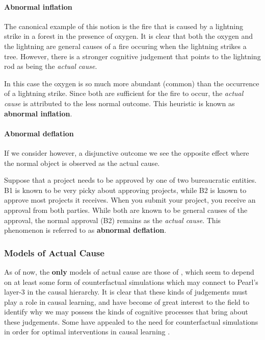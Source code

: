 \documentclass[10pt,letterpaper]{article}
\begin{document}
\paragraph{Abnormal inflation}
The canonical example of this notion is the fire that is caused by a lightning strike in a forest in the presence of oxygen. It is clear that both the oxygen and the lightning are general causes of a fire occuring when the lightning strikes a tree. However, there is a stronger cognitive judgement that points to the lightning rod as being the \textit{actual cause}.

In this case the oxygen is so much more abundant (common) than the occurrence of a lightning strike. Since both are sufficient for the fire to occur, the \textit{actual cause} is attributed to the less normal outcome. This heuristic is known as \textbf{abnormal inflation}.

\paragraph{Abnormal deflation}
If we consider however, a disjunctive outcome we see the opposite effect where the normal object is observed as the actual cause.

Suppose that a project needs to be approved by one of two bureaucratic entities. B1 is known to be very picky about approving projects, while B2 is known to approve most projects it receives. When you submit your project, you receive an approval from both parties. While both are known to be general causes of the approval, the normal approval (B2) remains as the \textit{actual cause}. This phenomenon is referred to as \textbf{abnormal deflation}.

\subsubsection*{Models of Actual Cause}

As of now, the \textbf{only} models of actual cause are those of \citep{ICARD201780,Quillien2022}, which seem to depend on at least some form of counterfactual simulations which may connect to Pearl's layer-3 in the causal hierarchy. It is clear that these kinds of judgements must play a role in causal learning, and have become of great interest to the field to identify why we may possess the kinds of cognitive processes that bring about these judgements. Some have appealed to the need for counterfactual simulations in order for optimal interventions in causal learning \citep{ICARD201780,NEURIPS2018_c0a271bc}. 
\end{document}
